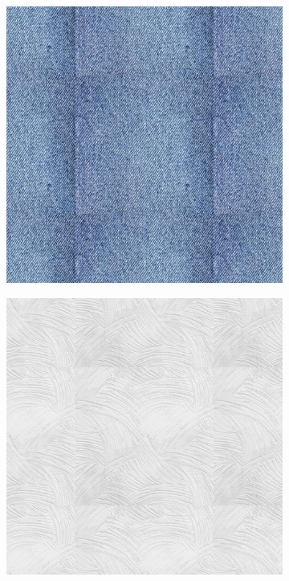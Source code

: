\begin{figure}[h]
    \centering
    \begin{subfigure}[b]{0.32\textwidth}
        \centering
        \includegraphics[width=\textwidth]{img/ch6/22fabric1.jpg}
    \end{subfigure}
    \begin{subfigure}[b]{0.32\textwidth}
        \centering
        \includegraphics[width=\textwidth]{img/ch6/22wall.jpg}

\end{subfigure}
\end{figure}
